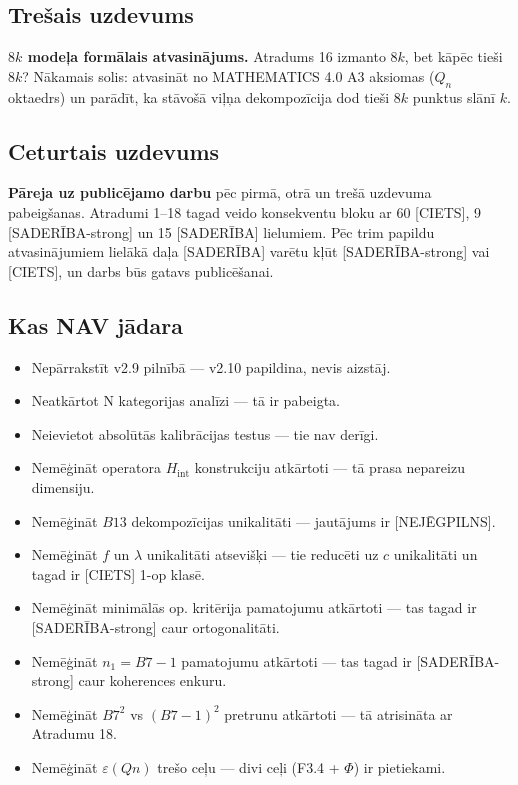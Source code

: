 \documentclass[12pt,a4paper]{article}
\begin{document}
\subsection*{Trešais uzdevums}

\textbf{$8k$ modeļa formālais atvasinājums.} Atradums 16 izmanto $8k$, bet kāpēc tieši $8k$? Nākamais solis: atvasināt no MATHEMATICS 4.0 A3 aksiomas ($Q_n$ oktaedrs) un parādīt, ka stāvošā viļņa dekompozīcija dod tieši $8k$ punktus slānī $k$.

\subsection*{Ceturtais uzdevums}

\textbf{Pāreja uz publicējamo darbu} pēc pirmā, otrā un trešā uzdevuma pabeigšanas. Atradumi 1–18 tagad veido konsekventu bloku ar 60 [CIETS], 9 [SADERĪBA-strong] un 15 [SADERĪBA] lielumiem. Pēc trim papildu atvasinājumiem lielākā daļa [SADERĪBA] varētu kļūt [SADERĪBA-strong] vai [CIETS], un darbs būs gatavs publicēšanai.

\subsection*{Kas NAV jādara}

\begin{itemize}
    \item Nepārrakstīt v2.9 pilnībā — v2.10 papildina, nevis aizstāj.
    \item Neatkārtot N kategorijas analīzi — tā ir pabeigta.
    \item Neievietot absolūtās kalibrācijas testus — tie nav derīgi.
    \item Nemēģināt operatora $H_{\text{int}}$ konstrukciju atkārtoti — tā prasa nepareizu dimensiju.
    \item Nemēģināt $B13$ dekompozīcijas unikalitāti — jautājums ir [NEJĒGPILNS].
    \item Nemēģināt $f$ un $\lambda$ unikalitāti atsevišķi — tie reducēti uz $c$ unikalitāti un tagad ir [CIETS] 1-op klasē.
    \item Nemēģināt minimālās op. kritērija pamatojumu atkārtoti — tas tagad ir [SADERĪBA-strong] caur ortogonalitāti.
    \item Nemēģināt $n_1 = B7-1$ pamatojumu atkārtoti — tas tagad ir [SADERĪBA-strong] caur koherences enkuru.
    \item Nemēģināt $B7^2$ vs $(B7-1)^2$ pretrunu atkārtoti — tā atrisināta ar Atradumu 18.
    \item Nemēģināt $\varepsilon(Qn)$ trešo ceļu — divi ceļi (F3.4 + $\Phi$) ir pietiekami.
\end{itemize}
\end{document}
